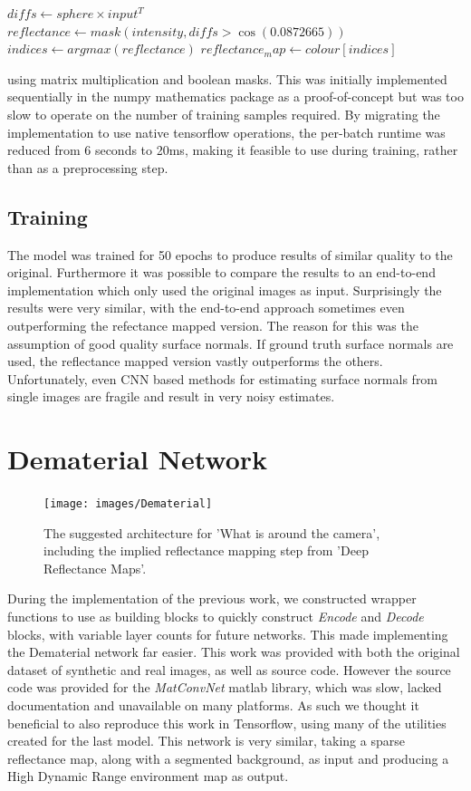 \documentclass[ %
                    author={Gavin Parker},
                supervisor={Dr. Neill Campbell},
                    degree={MEng},
                     title={Deep Siamese Networks for Illumination Estimation from Stereo Images},
                  subtitle={},
                      type={Research},
                      year={2018} ]{dissertation}
\begin{document}
\begin{algorithm}
$ diffs \leftarrow sphere \times input^T $\;
$ reflectance \leftarrow mask(intensity, diffs > \cos(0.0872665)) $\;
$ indices \leftarrow argmax(reflectance) $\;
$ reflectance_map \leftarrow colour[indices] $\;
\end{algorithm}
using matrix multiplication and boolean masks. This was initially implemented sequentially in the numpy mathematics package as a proof-of-concept but was too slow to operate on the number of training samples required. By migrating the implementation to use native tensorflow operations, the per-batch runtime was reduced from 6 seconds to 20ms, making it feasible to use during training, rather than as a preprocessing step.

\subsection{Training}
The model was trained for 50 epochs to produce results of similar quality to the original. Furthermore it was possible to compare the results to an end-to-end implementation which only used the original images as input. Surprisingly the results were very similar, with the end-to-end approach sometimes even outperforming the refectance mapped version. The reason for this was the assumption of good quality surface normals. If ground truth surface normals are used, the reflectance mapped version vastly outperforms the others. Unfortunately, even CNN based methods for estimating surface normals from single images are fragile and result in very noisy estimates.
\section{Dematerial Network}
\begin{figure}[H]
\texttt{[image: images/Dematerial]}
\caption 
\newline
The suggested architecture for 'What is around the camera', including the implied reflectance mapping step from 'Deep Reflectance Maps'.
\end{figure}
During the implementation of the previous work, we constructed wrapper functions to use as building blocks to quickly construct \textit{Encode} and \textit{Decode} blocks, with variable layer counts for future networks. This made implementing the Dematerial network far easier. This work was provided with both the original dataset of synthetic and real images, as well as source code. However the source code was provided for the \textit{MatConvNet} matlab library, which was slow, lacked documentation and unavailable on many platforms. As such we thought it beneficial to also reproduce this work in Tensorflow, using many of the utilities created for the last model. This network is very similar, taking a sparse reflectance map, along with a segmented background, as input and producing a High Dynamic Range environment map as output.
\end{document}
